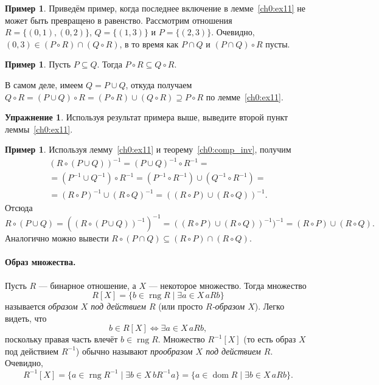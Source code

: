 \documentclass[12pt,notitlepage]{article}
\theoremstyle{plain}
\theoremstyle{definition}
\newtheorem{exc}[thm]{Упражнение}
\newtheorem{exm}[thm]{Пример}
\theoremstyle{plain}
\newcommand{\sbs}{\subseteq}
\newcommand{\dom}{\mathop{\mathrm{dom}}}
\newcommand{\rng}{\mathop{\mathrm{rng}}}
\newcommand{\1}{\mathbf{1}}
\newcommand{\0}{\mathbf{0}}
\begin{document}
\begin{exm}
	Приведём пример, когда последнее включение в лемме~\ref{ch0:ex11} не может быть превращено в равенство. Рассмотрим отношения $R = \{(0,1), (0,2)\}$, $Q = \{(1,3)\}$ и $P = \{(2,3)\}$. Очевидно, $(0,3) \in (P \circ R) \cap (Q \circ R)$, в то время как $P \cap Q$ и $(P\cap Q) \circ R$ пусты.
\end{exm}

\begin{exm}
	Пусть $P \sbs Q$. Тогда $P \circ R \sbs Q \circ R$.
	
	В самом деле, имеем $Q = P \cup Q$, откуда получаем
	$Q \circ R = (P \cup Q) \circ R = (P \circ R) \cup (Q \circ R) \supseteq P \circ R$ по лемме~\ref{ch0:ex11}.
\end{exm}

\begin{exc}
	Используя результат примера выше, выведите второй пункт леммы~\ref{ch0:ex11}.
\end{exc}


\begin{exm}\label{ch0:exm17}
	Используя лемму~\ref{ch0:ex11} и теорему~\ref{ch0:comp_inv}, получим
	\begin{multline*}
		(R \circ (P \cup Q))^{-1} = (P \cup Q)^{-1} \circ R^{-1} =\\
		=(P^{-1} \cup Q^{-1}) \circ R^{-1} = (P^{-1} \circ R^{-1}) \cup (Q^{-1} \circ R^{-1}) =\\
		=(R \circ P)^{-1} \cup (R \circ Q)^{-1} = ((R \circ P) \cup (R \circ Q))^{-1}.
	\end{multline*}
	Отсюда
	$$
	R \circ (P \cup Q) = ((R \circ (P \cup Q))^{-1})^{-1} = ((R \circ P) \cup (R \circ Q))^{-1})^{-1} = (R \circ P) \cup (R \circ Q).
	$$
	Аналогично можно вывести $R \circ (P \cap Q) \sbs (R \circ P) \cap (R \circ Q)$.
\end{exm}

\paragraph{Образ множества.} Пусть $R$ --- бинарное отношение, а $X$ --- некоторое множество. Тогда множество
$$R[X] = \{ b \in \rng R \mid \exists a \in X\, a R b \}$$
называется \emph{образом $X$ под действием $R$} (или просто \emph{$R$-образом $X$}). Легко видеть, что
$$b \in R[X] \iff \exists a \in X\, a R b,$$
поскольку правая часть влечёт $b \in \rng R$. Множество $R^{-1}[X]$ (то есть образ $X$ под действием $R^{-1}$) обычно называют \emph{прообразом $X$ под действием $R$}. Очевидно,
$$R ^{-1}[X] = \{ a \in \rng R^{-1} \mid \exists b \in X\, b R^{-1} a \} =  \{ a \in \dom R \mid \exists b \in X\, a R b \}.$$
\end{document}
